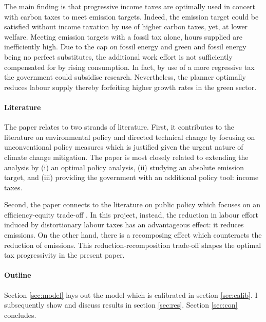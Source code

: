 The main finding is that progressive income taxes are optimally used in concert with carbon taxes to meet emission targets. Indeed, the emission target could be satisfied without income taxation by use of higher carbon taxes, yet, at lower welfare.  
Meeting emission targets with a fossil tax alone, hours supplied are inefficiently high. Due to the cap on fossil energy and green and fossil energy being no perfect substitutes, the additional work effort is not sufficiently compensated for by rising consumption.  
In fact, by use of a more regressive tax the government could subsidise research. Nevertheless, the planner optimally reduces labour supply thereby forfeiting higher growth rates in the green sector. %

\paragraph{Literature}
The paper relates to two strands of literature. First, it contributes to the literature on environmental policy and directed technical change \citep[e.g.][]{Acemoglu2012TheChange, Acemoglu2016TransitionTechnology} by focusing on unconventional policy measures which is justified given the urgent nature of climate change mitigation.  The paper is most closely related to \cite{Fried2018ClimateAnalysis} extending the analysis by (i) an optimal policy analysis, (ii) studying an absolute emission target, and (iii) providing the government with an additional policy tool: income taxes.

Second, the paper connects to the literature on public policy which focuses on an efficiency-equity trade-off \citep{Heathcote2017OptimalFramework, Loebbing2019NationalChange}. In this project, instead, the reduction in labour effort induced by distortionary labour taxes has an advantageous effect: it reduces emissions. On the other hand, there is a recomposing effect which counteracts the reduction of emissions. This reduction-recomposition trade-off shapes the optimal tax progressivity in the present paper. 


\paragraph{Outline} Section \ref{sec:model} lays out the model which is calibrated in section \ref{sec:calib}. I subsequently show and discuss results in section \ref{sec:res}. Section \ref{sec:con} concludes. 